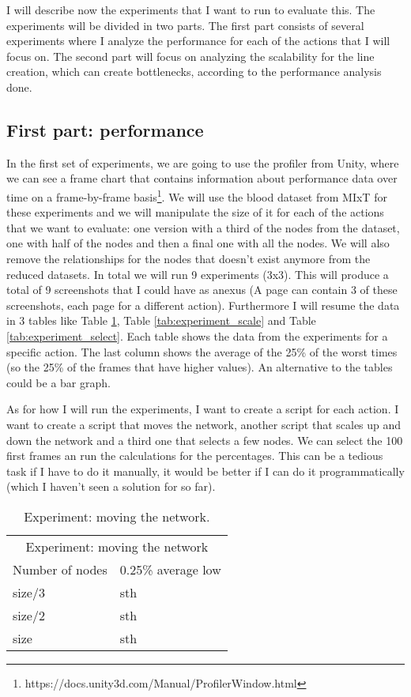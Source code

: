 I will describe now the experiments that I want to run to evaluate this. The experiments will be divided in two parts. The first part consists of several experiments where I analyze the performance for each of the actions that I will focus on. The second part will focus on analyzing the scalability for the line creation, which can create bottlenecks, according to the performance analysis done.

\subsection{First part: performance}

In the first set of experiments, we are going to use the profiler from Unity, where we can see a frame chart that contains information about performance data over time on a frame-by-frame basis\footnote{https://docs.unity3d.com/Manual/ProfilerWindow.html}. We will use the blood dataset from MIxT for these experiments and we will manipulate the size of it for each of the actions that we want to evaluate: one version with a third of the nodes from the dataset, one with half of the nodes and then a final one with all the nodes. We will also remove the relationships for the nodes that doesn't exist anymore from the reduced datasets. In total we will run 9 experiments (3x3). This will produce a total of 9 screenshots that I could have as anexus (A page can contain 3 of these screenshots, each page for a different action). Furthermore I will resume the data in 3 tables like Table \ref{tab:experiment_moving}, Table \ref{tab:experiment_scale} and Table \ref{tab:experiment_select}. Each table shows the data from the experiments for a specific action. The last column shows the average of the 25\% of the worst times (so the 25\% of the frames that have higher values). An alternative to the tables could be a bar graph.

As for how I will run the experiments, I want to create a script for each action. I want to create a script that moves the network, another script that scales up and down the network and a third one that selects a few nodes. We can select the 100 first frames an run the calculations for the percentages. This can be a tedious task if I have to do it manually, it would be better if I can do it programmatically (which I haven't seen a solution for so far).

\begin{table}[h!]
\centering
\begin{tabular}{ll}
\multicolumn{2}{c}{Experiment: moving the network} \\
Number of nodes   & 0.25\% average low \\
size/3 & sth \\
size/2 & sth \\
size & sth \\
\end{tabular}
\caption{Experiment: moving the network.}
\label{tab:experiment_moving}
\end{table}

